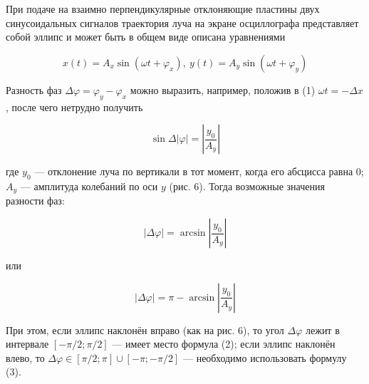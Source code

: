 \documentclass[14pt]{article}
\begin{document}
При подаче на взаимно перпендикулярные отклоняющие пластины двух синусоидальных сигналов траектория луча на экране осциллографа представляет собой эллипс и может быть в общем виде описана уравнениями

\setcounter{equation}{0}
\begin{equation}
x(t) = A_x \sin(\omega t + \varphi_x),~
y(t) = A_y \sin(\omega t + \varphi_y)
\end{equation}

\noindent Разность фаз $\Delta\varphi = \varphi_y - \varphi_x$ можно выразить, например, положив в (1) $\omega t = - \Delta x$, после чего нетрудно получить

\begin{equation}
\sin \Delta \left|\varphi\right| = \left|\frac{y_0}{A_y}\right|
\end{equation}

\noindent где $y_0$ --- отклонение луча по вертикали в тот момент, когда его абсцисса равна 0; $A_y$ --- амплитуда колебаний по оси 
$y$ (рис. 6). Тогда возможные значения разности фаз:

\begin{equation}
\left|\Delta \varphi\right| = \arcsin \left|\frac{y_0}{A_y}\right|
\end{equation}

\noindent или

\begin{equation}
\left|\Delta \varphi\right| = \pi - \arcsin \left|\frac{y_0}{A_y}\right|
\end{equation}

\noindent При этом, если эллипс наклонён вправо (как на рис. 6), то угол $\Delta\varphi$ лежит в интервале $[-\pi/2; \pi/2]$ — имеет место формула (2); если эллипс наклонён влево, то $\Delta\varphi \in [\pi/2; \pi] \cup [-\pi; -\pi/2]$ — необходимо
использовать формулу (3).
\end{document}

